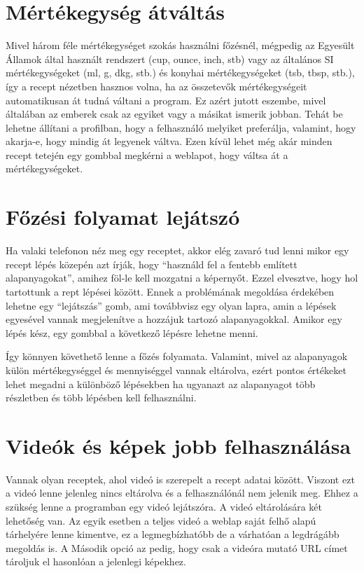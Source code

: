 \documentclass[12pt]{report}
\theoremstyle{definition}
\begin{document}
\section{Mértékegység átváltás}
Mivel három féle mértékegységet szokás használni főzésnél, mégpedig az Egyesült Államok által használt rendszert (cup, ounce, inch, stb) vagy az általános SI mértékegységeket (ml, g, dkg, stb.) és konyhai mértékegységeket (tsb, tbsp, stb.), így a recept nézetben hasznos volna, ha az összetevők mértékegységeit automatikusan át tudná váltani a program. Ez azért jutott eszembe, mivel általában az emberek csak az egyiket vagy a másikat ismerik jobban. Tehát be lehetne állítani a profilban, hogy a felhasználó melyiket preferálja, valamint, hogy akarja-e, hogy mindig át legyenek váltva. Ezen kívül lehet még akár minden recept tetején egy gombbal megkérni a weblapot, hogy váltsa át a mértékegységeket.

\section{Főzési folyamat lejátszó}
Ha valaki telefonon néz meg egy receptet, akkor elég zavaró tud lenni mikor egy recept lépés közepén azt írják, hogy “használd fel a fentebb említett alapanyagokat”, amihez föl-le kell mozgatni a képernyőt. Ezzel elvesztve, hogy hol tartottunk a rept lépései között. Ennek a problémának megoldása érdekében lehetne egy “lejátszás” gomb, ami továbbvisz egy olyan lapra, amin a lépések egyesével vannak megjelenítve  a hozzájuk tartozó alapanyagokkal. Amikor egy lépés kész, egy gombbal a következő lépésre lehetne menni. 

Így könnyen követhető lenne a főzés folyamata. Valamint, mivel az alapanyagok külön mértékegységgel és mennyiséggel vannak eltárolva, ezért pontos értékeket lehet megadni a különböző lépésekben ha ugyanazt az alapanyagot több részletben és több lépésben kell felhasználni.


\section{Videók és képek jobb felhasználása}
Vannak olyan receptek, ahol videó is szerepelt a recept adatai között. Viszont ezt a videó lenne  jelenleg nincs eltárolva és a felhasználónál nem jelenik meg. Ehhez a szükség lenne a programban egy videó lejátszóra. A videó eltárolására két lehetőség van. Az egyik esetben a teljes videó a weblap saját felhő alapú tárhelyére lenne kimentve, ez a legmegbízhatóbb de a várhatóan a legdrágább megoldás is. A Második opció az pedig, hogy csak a videóra mutató URL címet tároljuk el hasonlóan a jelenlegi képekhez.
\end{document}

